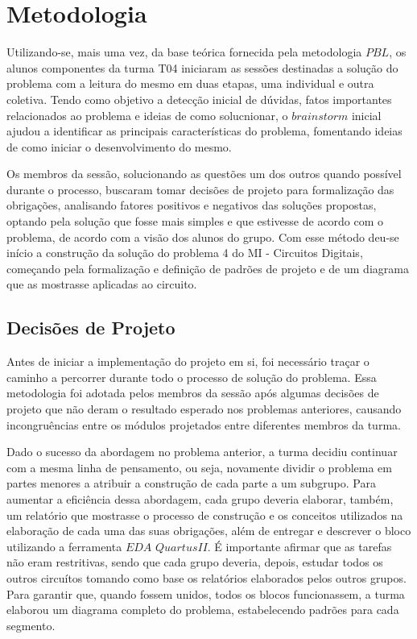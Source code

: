 \documentclass[12pt]{article}
\begin{document}
\section{Metodologia}
Utilizando-se, mais uma vez, da base teórica fornecida pela metodologia $PBL$, os alunos componentes da turma T04 iniciaram as sessões destinadas a solução do problema com a leitura do mesmo em duas etapas, uma individual e outra coletiva. Tendo como objetivo a detecção inicial de dúvidas, fatos importantes relacionados ao problema e ideias de como solucnionar, o $brainstorm$ inicial ajudou a identificar as principais características do problema, fomentando ideias de como iniciar o desenvolvimento do mesmo.


Os membros da sessão, solucionando as questões um dos outros quando possível durante o processo, buscaram tomar decisões de projeto para formalização das obrigações, analisando fatores positivos e negativos das soluções propostas, optando pela solução que fosse mais simples e que estivesse de acordo com o problema, de acordo com a visão dos alunos do grupo. Com esse método deu-se início a construção da solução do problema 4 do MI - Circuitos Digitais, começando pela formalização e definição de padrões de projeto e de um diagrama que as mostrasse aplicadas ao circuito.

\subsection{Decisões de Projeto}

Antes de iniciar a implementação do projeto em si, foi necessário traçar o caminho a percorrer durante todo o processo de solução do problema. Essa metodologia foi adotada pelos membros da sessão após algumas decisões de projeto que não deram o resultado esperado nos problemas anteriores, causando incongruências entre os módulos projetados entre diferentes membros da turma. 


Dado o sucesso da abordagem no problema anterior, a turma decidiu continuar com a mesma linha de pensamento, ou seja, novamente dividir o problema em partes menores a atribuir a construção de cada parte a um subgrupo. Para aumentar a eficiência dessa abordagem, cada grupo deveria elaborar, também, um relatório que mostrasse o processo de construção e os conceitos utilizados na elaboração de cada uma das suas obrigações, além de entregar e descrever o bloco utilizando a ferramenta $EDA$ $Quartus II$. É importante afirmar que as tarefas não eram restritivas, sendo que cada grupo deveria, depois, estudar todos os outros circuítos tomando como base os relatórios elaborados pelos outros grupos. Para garantir que, quando fossem unidos, todos os blocos funcionassem, a turma elaborou um diagrama completo do problema, estabelecendo padrões para cada segmento.
\end{document}
